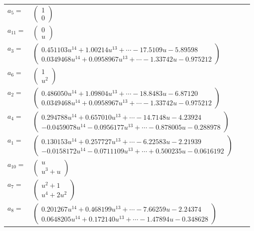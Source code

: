 \documentclass[1p]{elsarticle_modified}
\theoremstyle{definition}
\begin{document}
\begin{tabular}{m{7pt} m{180pt} m{7pt} m{180pt} }
\flushright $a_{5}=$&$\begin{pmatrix}1\\0\end{pmatrix}$ \\
\flushright $a_{11}=$&$\begin{pmatrix}0\\u\end{pmatrix}$ \\
\flushright $a_{3}=$&$\begin{pmatrix}0.451103 u^{14}+1.00214 u^{13}+\cdots-17.5109 u-5.89598\\0.0349468 u^{14}+0.0958967 u^{13}+\cdots-1.33742 u-0.975212\end{pmatrix}$ \\
\flushright $a_{6}=$&$\begin{pmatrix}1\\u^2\end{pmatrix}$ \\
\flushright $a_{2}=$&$\begin{pmatrix}0.486050 u^{14}+1.09804 u^{13}+\cdots-18.8483 u-6.87120\\0.0349468 u^{14}+0.0958967 u^{13}+\cdots-1.33742 u-0.975212\end{pmatrix}$ \\
\flushright $a_{4}=$&$\begin{pmatrix}0.294788 u^{14}+0.657010 u^{13}+\cdots-14.7148 u-4.23924\\-0.0459078 u^{14}-0.0956177 u^{13}+\cdots-0.878005 u-0.288978\end{pmatrix}$ \\
\flushright $a_{1}=$&$\begin{pmatrix}0.130153 u^{14}+0.257727 u^{13}+\cdots-6.22583 u-2.21939\\-0.0158172 u^{14}-0.0711109 u^{13}+\cdots+0.500235 u-0.0616192\end{pmatrix}$ \\
\flushright $a_{10}=$&$\begin{pmatrix}u\\u^3+u\end{pmatrix}$ \\
\flushright $a_{7}=$&$\begin{pmatrix}u^2+1\\u^4+2 u^2\end{pmatrix}$ \\
\flushright $a_{8}=$&$\begin{pmatrix}0.201267 u^{14}+0.468199 u^{13}+\cdots-7.66259 u-2.24374\\0.0648205 u^{14}+0.172140 u^{13}+\cdots-1.47894 u-0.348628\end{pmatrix}$ \\

\end{tabular}
\end{document}
